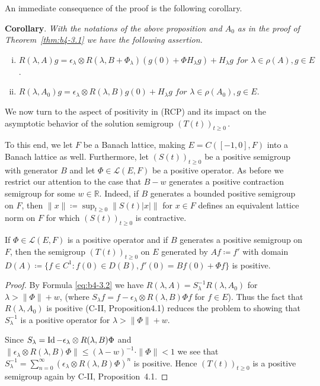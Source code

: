 An immediate consequence of the proof is the following corollary.

\medskip\noindent%
\textbf{Corollary}. 
\textit{ With the notations of the above proposition and $A_{0}$ as in the proof of Theorem~\ref{thm:b4-3.1} we have the following assertion.}
\begin{enumerate}[(i),wide]
	\item  
	$R(\lambda,A)g = \epsilon_\lambda \otimes R(\lambda,B+\Phi_\lambda)(g(0)+\Phi H_\lambda g) + H_\lambda g \textit{ for } \lambda \in \rho(A), g \in E$.

	\item 
	$R(\lambda,A_{0})g = \epsilon_\lambda \otimes R(\lambda,B)g(0) + H_\lambda g \textit{ for }  \lambda \in \rho(A_{0}), g \in E$.
\end{enumerate}

We now turn to the aspect of positivity in (RCP) and its impact on the asymptotic behavior of the solution semigroup $(T(t))_{t \geq 0}$\,.

To this end, we let $F$ be a Banach lattice, making $E = C([-1,0],F)$ into a Banach lattice as well. 
Furthermore, let $(S(t))_{t \geq 0}$ be a positive semigroup with generator $B$ and let $\Phi \in \mathcal{L}(E,F)$ be a positive operator. 
As before we restrict our attention to the case that $B - w$ generates a positive contraction semigroup for some $w \in \mathbb{R}$. 
Indeed, if $B$ generates a bounded positive semigroup on $F$, then $\|x\|  \coloneq  \sup_{t \geq 0}\|S(t)|x|\|$ for $x \in F$ defines an equivalent lattice norm on $F$ for which $(S(t))_{t \geq 0}$ is contractive.
\begin{proposition}\label{prop:b4-3.5}
	If $\Phi \in \mathcal{L}(E,F)$ is a positive operator and if $B$ generates a positive semigroup on $F$, then the semigroup $(T(t))_{t \geq 0}$ on $E$ generated by $Af  \coloneq  f'$ with domain $D(A)  \coloneq  \{f \in C^1 \colon f(0) \in D(B), f'(0) = Bf(0) + \Phi f\}$ is positive.
\end{proposition}
%
%
\begin{proof} By Formula \eqref{eq:b4-3.2} we have $R(\lambda,A) = S_\lambda^{-1}R(\lambda,A_{0})$ for $\lambda > \|\Phi\|+w$, (where $S_\lambda f = f - \epsilon_\lambda \otimes R(\lambda,B)\Phi f$ for $f \in E$). 
Thus the fact that $R(\lambda,A_{0})$ is positive (C-II, Proposition4.1) reduces the problem to showing that $S_\lambda^{-1}$ is a positive operator for $\lambda > \|\Phi\|+w$.

Since $S_\lambda = \operatorname{Id}  - \epsilon_\lambda \otimes R(\lambda,B)\Phi$ and $\|\epsilon_\lambda \otimes R(\lambda,B)\Phi\| \leq (\lambda-w)^{-1} \cdot \|\Phi\| < 1$ we see that $S_\lambda^{-1} = \sum_{n=0}^{\infty}(\epsilon_\lambda \otimes R(\lambda,B)\Phi)^n$ is positive. 
Hence $(T(t))_{t \geq 0}$ is a positive semigroup again by C-II, Proposition~4.1.
\end{proof}

